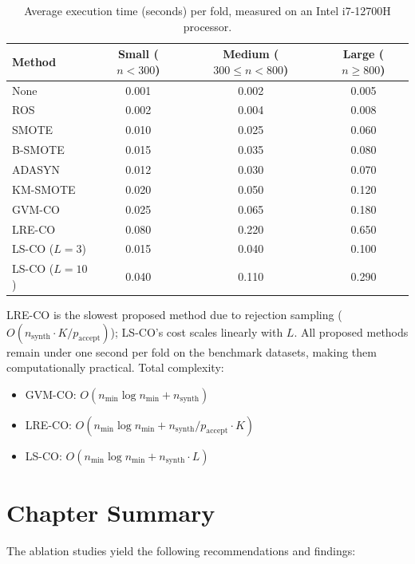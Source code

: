 \begin{table}[H]
\centering
\caption{Average execution time (seconds) per fold, measured on an Intel i7-12700H processor.}
\label{tab:abl:time}
\begin{tabular}{lccc}
\toprule
\textbf{Method} & \textbf{Small ($n < 300$)} & \textbf{Medium ($300 \leq n < 800$)} & \textbf{Large ($n \geq 800$)} \\
\midrule
None              & 0.001 & 0.002 & 0.005 \\
ROS               & 0.002 & 0.004 & 0.008 \\
SMOTE             & 0.010 & 0.025 & 0.060 \\
B-SMOTE           & 0.015 & 0.035 & 0.080 \\
ADASYN            & 0.012 & 0.030 & 0.070 \\
KM-SMOTE          & 0.020 & 0.050 & 0.120 \\
GVM-CO            & 0.025 & 0.065 & 0.180 \\
LRE-CO            & 0.080 & 0.220 & 0.650 \\
LS-CO ($L=3$)     & 0.015 & 0.040 & 0.100 \\
LS-CO ($L=10$)    & 0.040 & 0.110 & 0.290 \\
\bottomrule
\end{tabular}
\end{table}

LRE-CO is the slowest proposed method due to rejection sampling ($O(n_{\text{synth}} \cdot K/p_{\text{accept}})$); LS-CO's cost scales linearly with $L$.
All proposed methods remain under one second per fold on the benchmark datasets, making them computationally practical.
Total complexity:
\begin{itemize}[leftmargin=*]
    \item GVM-CO: $O(n_{\min} \log n_{\min} + n_{\text{synth}})$
    \item LRE-CO: $O(n_{\min} \log n_{\min} + n_{\text{synth}} / p_{\text{accept}} \cdot K)$
    \item LS-CO: $O(n_{\min} \log n_{\min} + n_{\text{synth}} \cdot L)$
\end{itemize}


\section{Chapter Summary}
\label{sec:abl:summary}

The ablation studies yield the following recommendations and findings:


